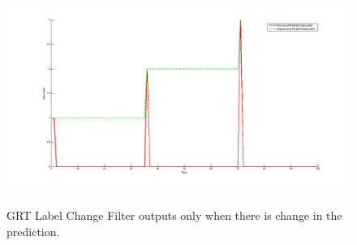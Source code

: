 \begin{figure}
	[h] \centering 
	\includegraphics[height=7cm]{figures/content/grt-label-change-filter.jpg} \caption{GRT Label Change Filter outputs only when there is change in the prediction. \cite{grt-spec}} \label{fg:grt:label:change} 
\end{figure}
